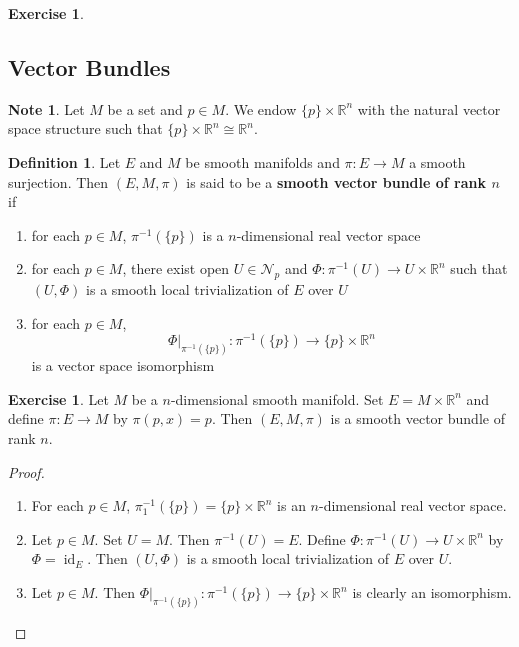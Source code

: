\documentclass{book}
\theoremstyle{definition}
\newtheorem{defn}[definition]{Definition}
\newtheorem{note}[definition]{Note}
\newtheorem{ex}[definition]{Exercise}
\newcommand{\R}{\mathbb{R}}
\newcommand{\MN}{\mathcal{N}}
\DeclareMathOperator{\id}{id}
\DeclareMathOperator*{\0}{\mbf{0}}
\DeclareMathOperator*{\1}{\mbf{1}}
\newcommand{\tbf}[1]{\textbf{#1}}
\begin{document}
	\begin{ex}
		
	\end{ex}
	



























	\subsection{Vector Bundles}

	\begin{note}
		Let $M$ be a set and $p \in M$. We endow $\{p\} \times \R^n$ with the natural vector space structure such that $\{p\} \times \R^n \cong \R^n$.
	\end{note}

	\begin{defn}
		Let $E$ and $M$ be smooth manifolds and $\pi: E \rightarrow M$ a smooth surjection. Then $(E, M, \pi)$ is said to be a \tbf{smooth vector bundle of rank $n$} if 
		\begin{enumerate}
			\item for each $p \in M$, $\pi^{-1}(\{p\})$ is a $n$-dimensional real vector space
			\item for each $p \in M$, there exist open $U \in \MN_p$ and $\Phi: \pi^{-1}(U) \rightarrow U \times \R^n$ such that $(U, \Phi)$ is a smooth local trivialization of $E$ over $U$
			\item for each $p \in M$, $$\Phi|_{\pi^{-1}(\{p\})}: \pi^{-1}(\{p\}) \rightarrow \{p\} \times \R^n$$ is a vector space isomorphism
		\end{enumerate}
	\end{defn}

\begin{ex}
Let $M$ be a $n$-dimensional smooth manifold. Set $E = M \times \R^n$ and define $\pi: E \rightarrow M$ by $\pi(p, x) = p $. Then $(E, M, \pi)$ is a smooth vector bundle of rank $n$.
\end{ex}

\begin{proof}\
\begin{enumerate}
\item For each $p \in M$, $\pi_1^{-1}(\{p\}) = \{p\} \times \R^n$ is an $n$-dimensional real vector space.
\item Let $p \in M$. Set $U = M$. Then $\pi^{-1}(U) = E$. Define $\Phi: \pi^{-1}(U) \rightarrow U \times \R^n$ by $\Phi = \id_E$. Then $(U, \Phi)$ is a smooth local trivialization of $E$ over $U$.   
\item Let $p \in M$. Then $\Phi|_{\pi^{-1}(\{p\})}: \pi^{-1}(\{p\}) \rightarrow \{p\} \times \R^n$ is clearly an isomorphism. 
\end{enumerate}
\end{proof}
\end{document}
